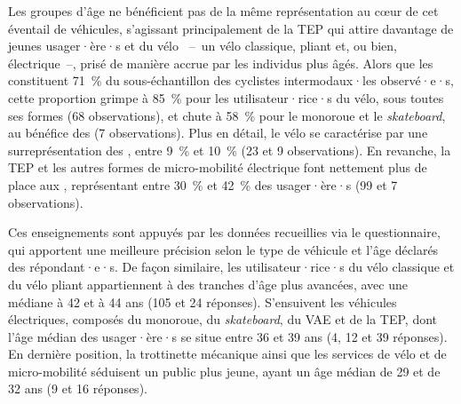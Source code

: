 \begin{refsegment}
Les groupes d'âge ne bénéficient pas de la même représentation au cœur de cet éventail de véhicules, s'agissant principalement de la \acrshort{TEP} qui attire davantage de jeunes usager·ère·s et du vélo ~–~un vélo classique, pliant et, ou bien, électrique~–, prisé de manière accrue par les individus plus âgés. Alors que les  constituent 71~\% du sous-échantillon des cyclistes intermodaux·les observé·e·s, cette proportion grimpe à 85~\% pour les utilisateur·rice·s du vélo, sous toutes ses formes (68 observations), et chute à 58~\% pour le monoroue et le \textsl{skateboard}, au bénéfice des  (7 observations). Plus en détail, le vélo se caractérise par une surreprésentation des , entre 9~\% et 10~\% (23 et 9 observations). En revanche, la \acrshort{TEP} et les autres formes de micro-mobilité électrique font nettement plus de place aux , représentant entre 30~\% et 42~\% des usager·ère·s (99 et 7 observations).%

Ces enseignements sont appuyés par les données recueillies via le questionnaire, qui apportent une meilleure précision selon le type de véhicule et l'âge déclarés des répondant·e·s. De façon similaire, les utilisateur·rice·s du vélo classique et du vélo pliant appartiennent à des tranches d'âge plus avancées, avec une médiane à 42 et à 44 ans (105 et 24 réponses). S'ensuivent les véhicules électriques, composés du monoroue, du \textsl{skateboard}, du \acrshort{VAE} et de la \acrshort{TEP}, dont l'âge médian des usager·ère·s se situe entre 36 et 39 ans (4, 12 et 39 réponses). En dernière position, la trottinette mécanique ainsi que les services de vélo et de micro-mobilité séduisent un public plus jeune, ayant un âge médian de 29 et de 32 ans (9 et 16 réponses).%


\end{refsegment}
